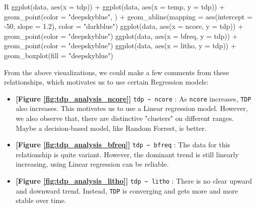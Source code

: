 \begin{code}{R}
ggplot(data, aes(x = tdp)) +
  ggplot(data, aes(x = temp, y = tdp)) +
  geom_point(color = "deepskyblue", ) +
  geom_abline(mapping = aes(intercept = -50, slope = 1.2), color = "darkblue")
ggplot(data, aes(x = ncore, y = tdp)) +
  geom_point(color = "deepskyblue")
ggplot(data, aes(x = bfreq, y = tdp)) +
  geom_point(color = "deepskyblue")
ggplot(data, aes(x = litho, y = tdp)) +
  geom_boxplot(fill = "deepskyblue")
\end{code}

From the above visualizations, we could make a few comments from these relationships, which motivates us to use certain Regression models:
\begin{itemize}
    \item \textbf{[Figure \ref{fig:tdp_analysis_ncore}]} \verb|tdp ~ ncore| : As \verb|ncore| increases, \verb|TDP| also increases. This motivates us to use 
    a Linear regression model. However, we also observe that, there are distinctive "clusters" on different ranges. Maybe a decision-based model, like Random Forrest,
    is better.
    
    \item \textbf{[Figure \ref{fig:tdp_analysis_bfreq}]} \verb|tdp ~ bfreq| : The data for this relationship is quite variant. However, the dominant trend is still linearly increasing,
    using Linear regression can be reliable.
    
    \item \textbf{[Figure \ref{fig:tdp_analysis_litho}]} \verb|tdp ~ litho| : There is no clear upward and downward trend. Instead, \verb|TDP| is converging and gets more and more stable over time. 
    


            

\end{itemize}
